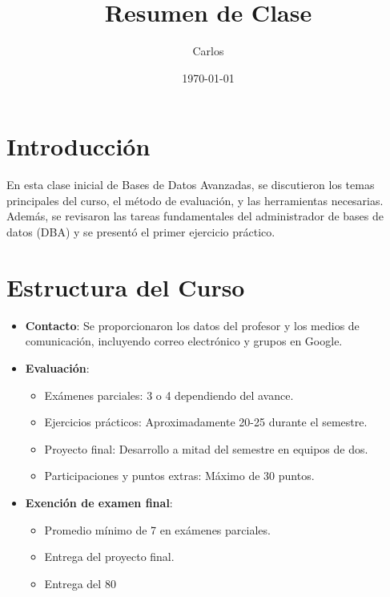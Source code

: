 \documentclass{article}
\title{Resumen de Clase}
\author{Carlos}
\date{\today}
\begin{document}
\maketitle

\section{Introducción}
En esta clase inicial de Bases de Datos Avanzadas, se discutieron los temas principales del curso, el método de evaluación, y las herramientas necesarias. Además, se revisaron las tareas fundamentales del administrador de bases de datos (DBA) y se presentó el primer ejercicio práctico.

\section{Estructura del Curso}
\begin{itemize}
    \item \textbf{Contacto}: Se proporcionaron los datos del profesor y los medios de comunicación, incluyendo correo electrónico y grupos en Google.
    \item \textbf{Evaluación}:
    \begin{itemize}
        \item Exámenes parciales: 3 o 4 dependiendo del avance.
        \item Ejercicios prácticos: Aproximadamente 20-25 durante el semestre.
        \item Proyecto final: Desarrollo a mitad del semestre en equipos de dos.
        \item Participaciones y puntos extras: Máximo de 30 puntos.
    \end{itemize}
    \item \textbf{Exención de examen final}:
    \begin{itemize}
        \item Promedio mínimo de 7 en exámenes parciales.
        \item Entrega del proyecto final.
        \item Entrega del 80%
    \end{itemize}
\end{itemize}
\end{document}
